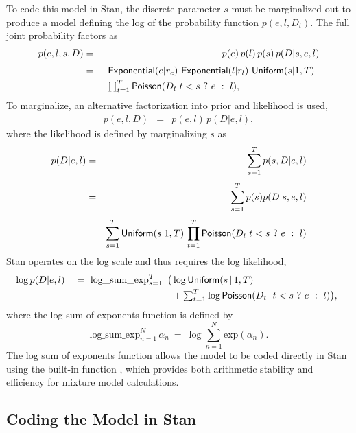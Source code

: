 To code this model in Stan, the discrete parameter $s$ must be
marginalized out to produce a model defining the log of the
probability function $p(e,l,D_t)$.  The full joint probability factors
as 
%
\begin{eqnarray*}
p(e,l,s,D)
& = & p(e) \, p(l) \, p(s) \, p(D | s, e, l)
\\[3pt]
& = & 
\begin{array}[t]{l}
\distro{Exponential}(e|r_e) \ \distro{Exponential}(l|r_l) \
\distro{Uniform}(s|1, T)
\\[3pt]
\prod_{t=1}^T \distro{Poisson}(D_t | t < s \ ? \ e \ : \ l),
\end{array}
\end{eqnarray*}
%
To marginalize, an alternative factorization into prior and likelihood
is used,
%
\begin{eqnarray*}
p(e,l,D) & = & p(e,l) \, p(D|e,l),
\end{eqnarray*}
%
where the likelihood is defined by marginalizing $s$ as
%
\begin{eqnarray*}
p(D | e,l) 
& = &
\sum_{s=1}^T p(s, D | e,l)
\\[3pt]
& = &
\sum_{s=1}^T p(s) p(D | s,e,l)
\\[3pt]
& = &
\sum_{s=1}^T \distro{Uniform}(s | 1,T) 
\, \prod_{t=1}^T \distro{Poisson}(D_t | t < s \ ? \ e \ : \ l)
\end{eqnarray*}
%
Stan operates on the log scale and thus requires the log likelihood,
%
\[
\log p(D | e,l)
\\[3pt]
\mbox{ } \ \ = \
\mbox{log\_sum\_exp}_{s=1}^T 
\begin{array}[t]{l}
\big(
 \log \distro{Uniform}(s \, | \, 1, T)
\\[3pt]
{} \hspace*{4pt} + \sum_{t=1}^T \log \distro{Poisson}(D_t \, | \, t < s \ ?
\ e \ : \ l) \big),
\end{array}
\]
%
where the log sum of exponents function is defined by
\[
\mbox{log\_sum\_exp}_{n=1}^N \, \alpha_n
\ = \
\log \sum_{n=1}^N \mbox{exp}(\alpha_n).
\]
%
The log sum of exponents function allows the model to be coded
directly in Stan using the built-in function ,
which provides both arithmetic stability and efficiency for mixture
model calculations.


\subsection{Coding the Model in Stan}

